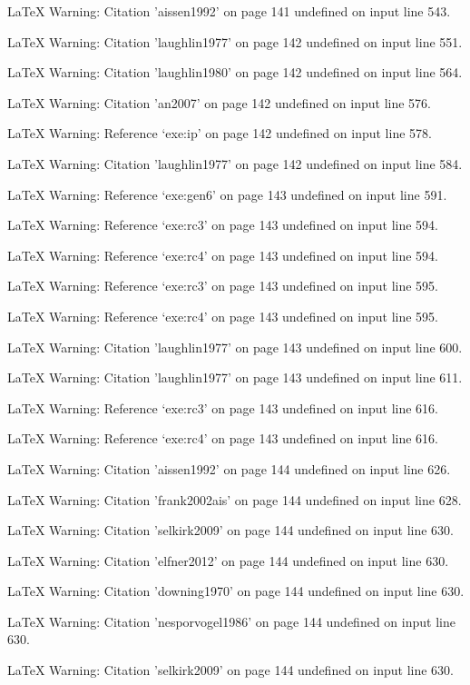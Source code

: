 LaTeX Warning: Citation 'aissen1992' on page 141 undefined on input line 543.


LaTeX Warning: Citation 'laughlin1977' on page 142 undefined on input line 551.


LaTeX Warning: Citation 'laughlin1980' on page 142 undefined on input line 564.


LaTeX Warning: Citation 'an2007' on page 142 undefined on input line 576.


LaTeX Warning: Reference `exe:ip' on page 142 undefined on input line 578.


LaTeX Warning: Citation 'laughlin1977' on page 142 undefined on input line 584.


LaTeX Warning: Reference `exe:gen6' on page 143 undefined on input line 591.


LaTeX Warning: Reference `exe:rc3' on page 143 undefined on input line 594.


LaTeX Warning: Reference `exe:rc4' on page 143 undefined on input line 594.


LaTeX Warning: Reference `exe:rc3' on page 143 undefined on input line 595.


LaTeX Warning: Reference `exe:rc4' on page 143 undefined on input line 595.


LaTeX Warning: Citation 'laughlin1977' on page 143 undefined on input line 600.


LaTeX Warning: Citation 'laughlin1977' on page 143 undefined on input line 611.


LaTeX Warning: Reference `exe:rc3' on page 143 undefined on input line 616.


LaTeX Warning: Reference `exe:rc4' on page 143 undefined on input line 616.


LaTeX Warning: Citation 'aissen1992' on page 144 undefined on input line 626.


LaTeX Warning: Citation 'frank2002ais' on page 144 undefined on input line 628.


LaTeX Warning: Citation 'selkirk2009' on page 144 undefined on input line 630.


LaTeX Warning: Citation 'elfner2012' on page 144 undefined on input line 630.


LaTeX Warning: Citation 'downing1970' on page 144 undefined on input line 630.


LaTeX Warning: Citation 'nesporvogel1986' on page 144 undefined on input line 630.


LaTeX Warning: Citation 'selkirk2009' on page 144 undefined on input line 630.


